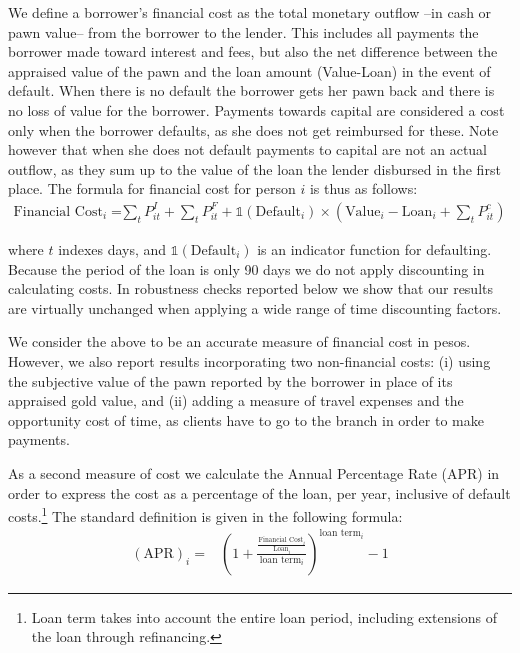 \documentclass[ecta,nameyear,final]{econsocart}
\begin{document}
We define a borrower's financial cost as the total monetary outflow --in cash or pawn value-- from the borrower to the lender. This includes all payments the borrower made toward interest and fees, but also the net difference between the appraised value of the pawn and the loan amount (Value-Loan) in the event of default. When there is no default the borrower gets her pawn back and there is no loss of value for the borrower. Payments towards capital are considered a cost only when the borrower defaults, as she does not get reimbursed for these. Note however that when she does not default payments to capital are not an actual outflow, as they sum up to the value of the loan the lender disbursed in the first place. The formula for financial cost for person $i$ is thus as follows: %
\begin{align*}
    \text{Financial Cost}_i =&  \sum_t P^I_{it} +\sum_t P^F_{it}  
     + \mathds{1}(\text{Default}_i) \times (\text{Value}_i-\text{Loan}_i + \sum_t P^c_{it})
\end{align*}

\noindent where $t$ indexes days, and $\mathds{1}(\text{Default}_i)$ is an indicator function for defaulting. Because the period of the loan is only 90 days we do not apply discounting in calculating costs.  In robustness checks reported below we show that our results are virtually unchanged when applying a wide range of time discounting factors.

We consider the above to be an accurate measure of financial cost in pesos. However, we also report results incorporating two non-financial costs: (i) using the subjective value of the pawn reported by the borrower in place of its appraised gold value, and (ii) adding a measure of travel expenses and the opportunity cost of time, as clients have to go to the branch in order to make payments.

As a second measure of cost we calculate the Annual Percentage Rate (APR) in order to express the cost as a percentage of the loan, per year, inclusive of default costs.\footnote{Loan term takes into account the entire loan period, including extensions of the loan through refinancing.} The standard definition is given in the following formula:
\begin{align*}
    (\text{APR})_i =&\left( 1 + \frac{\frac{\text{Financial Cost}_i}{\text{Loan}_i}}{\text{loan term}_i}\right)^{\text{loan term}_i}-1 
\end{align*}
\end{document}
